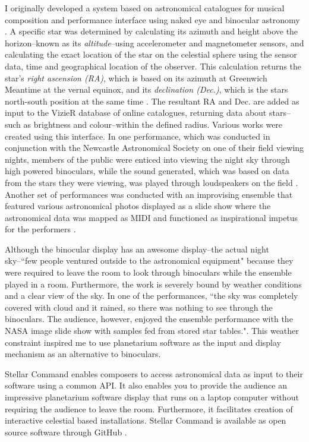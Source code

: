 I originally developed a system based on astronomical catalogues for musical composition and performance interface using naked eye and binocular astronomy \cite{fraietta2014musical}. A specific star was determined by calculating its azimuth and height above the horizon--known as its \textit {altitude}--using  accelerometer and magnetometer sensors, and calculating the exact location of the star on the celestial sphere using the sensor data, time and geographical location of the observer. This calculation returns the star's \textit{right ascension (RA)}, which is based on its azimuth at Greenwich Meantime at the vernal equinox,  and its \textit{declination (Dec.)}, which is the stars north-south position at the same time \cite{duffett2011practical, fraietta2014musical}. The resultant RA and Dec. are added as input to the VizieR database of online catalogues, returning data about stars--such as brightness and colour--within the defined radius. Various works were created using this interface. In one performance, which was  conducted in conjunction with the Newcastle Astronomical Society on one of their field viewing nights, members of the  public were enticed into viewing the night sky through high powered binoculars, while the sound generated, which was  based on data from the stars they were viewing, was played through loudspeakers on the field \cite{fraietta_segue}. 
Another set of performances was conducted with an improvising ensemble that featured various astronomical photos displayed as a slide show where the astronomical data was mapped as MIDI and functioned as inspirational impetus for the performers \cite{BriightSyzygy}. 

Although the binocular display has an awesome display--the actual night sky--``few people ventured outside to the astronomical equipment"\cite[p. ~50]{fraietta2014musical} because they were required to leave the room to look through binoculars while the ensemble played in a room. Furthermore, the work is severely bound by weather conditions and a clear view of the sky. In one of the performances, ``the sky was completely covered with cloud and it rained, so there was nothing to see through the binoculars. The audience, however, enjoyed the ensemble performance with the NASA image slide show with samples fed from stored star tables."\cite[p. ~50]{fraietta2014musical}.  This weather constraint inspired me to use planetarium software as the input and display mechanism as an alternative to binoculars.  

Stellar Command enables composers to access astronomical data as input to their software using a common API.  It also enables you to provide the audience an impressive planetarium software display that runs on a laptop computer without requiring the audience to leave the room. Furthermore, it facilitates creation of interactive celestial based installations. Stellar Command is available as open source software through GitHub \cite{fraiettaSTELLARCOMMAND}.
